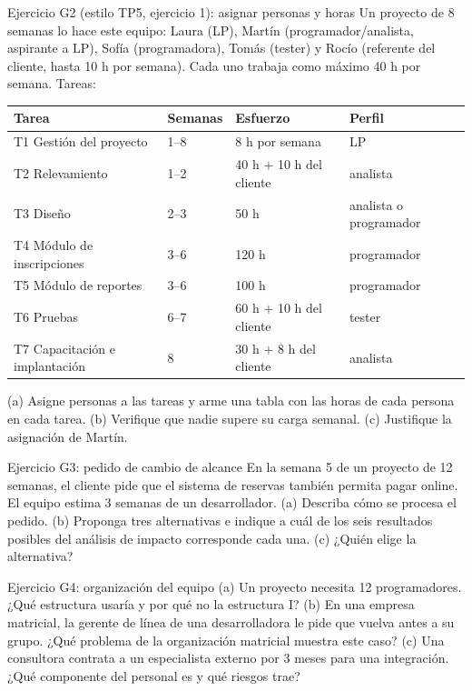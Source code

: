 \documentclass[11pt,a4paper]{article}
\begin{document}
\begin{enunciado}{Ejercicio G2 (estilo TP5, ejercicio 1): asignar personas y horas}
Un proyecto de 8 semanas lo hace este equipo: Laura (LP), Martín (programador/analista, aspirante a LP),
Sofía (programadora), Tomás (tester) y Rocío (referente del cliente, hasta 10 h por semana). Cada uno trabaja
como máximo 40 h por semana. Tareas:
\begin{center}\small
\begin{tabular}{llll}
\toprule
Tarea & Semanas & Esfuerzo & Perfil\\
\midrule
T1 Gestión del proyecto & 1--8 & 8 h por semana & LP\\
T2 Relevamiento & 1--2 & 40 h $+$ 10 h del cliente & analista\\
T3 Diseño & 2--3 & 50 h & analista o programador\\
T4 Módulo de inscripciones & 3--6 & 120 h & programador\\
T5 Módulo de reportes & 3--6 & 100 h & programador\\
T6 Pruebas & 6--7 & 60 h $+$ 10 h del cliente & tester\\
T7 Capacitación e implantación & 8 & 30 h $+$ 8 h del cliente & analista\\
\bottomrule
\end{tabular}
\end{center}
(a) Asigne personas a las tareas y arme una tabla con las horas de cada persona en cada tarea. (b) Verifique que
nadie supere su carga semanal. (c) Justifique la asignación de Martín.
\end{enunciado}
\begin{enunciado}{Ejercicio G3: pedido de cambio de alcance}
En la semana 5 de un proyecto de 12 semanas, el cliente pide que el sistema de reservas también permita pagar
online. El equipo estima 3 semanas de un desarrollador. (a) Describa cómo se procesa el pedido. (b) Proponga
tres alternativas e indique a cuál de los seis resultados posibles del análisis de impacto corresponde cada una.
(c) ¿Quién elige la alternativa?
\end{enunciado}
\begin{enunciado}{Ejercicio G4: organización del equipo}
(a) Un proyecto necesita 12 programadores. ¿Qué estructura usaría y por qué no la estructura I? (b) En una
empresa matricial, la gerente de línea de una desarrolladora le pide que vuelva antes a su grupo. ¿Qué problema
de la organización matricial muestra este caso? (c) Una consultora contrata a un especialista externo por 3
meses para una integración. ¿Qué componente del personal es y qué riesgos trae?
\end{enunciado}
\end{document}
